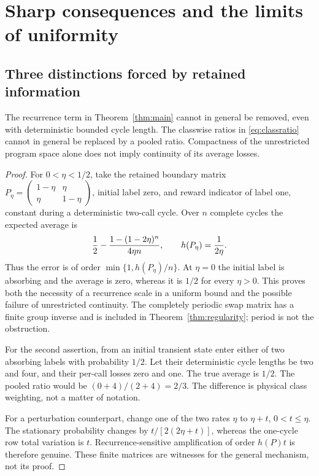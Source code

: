 \section{Sharp consequences and the limits of uniformity}\label{sec:sharp}
\subsection{Three distinctions forced by retained information}
\begin{proposition}\label{prop:boundarysharp}
The recurrence term in Theorem~\ref{thm:main} cannot in general be removed, even with deterministic bounded cycle length. The classwise ratios in \eqref{eq:classratio} cannot in general be replaced by a pooled ratio. Compactness of the unrestricted program space alone does not imply continuity of its average losses.
\end{proposition}
\begin{proof}
For $0<\eta<1/2$, take the retained boundary matrix
$P_\eta=\left(\begin{smallmatrix}1-\eta&\eta\\\eta&1-\eta\end{smallmatrix}\right)$,
initial label zero, and reward indicator of label one, constant during a deterministic two-call cycle. Over $n$ complete cycles the expected average is
\begin{equation}\label{eq:slow}
 {1\over2}-{1-(1-2\eta)^n\over4\eta n},
 \qquad h(P_\eta)={1\over2\eta}.
\end{equation}
Thus the error is of order $\min\{1,h(P_\eta)/n\}$. At $\eta=0$ the initial label is absorbing and the average is zero, whereas it is $1/2$ for every $\eta>0$. This proves both the necessity of a recurrence scale in a uniform bound and the possible failure of unrestricted continuity. The completely periodic swap matrix has a finite group inverse and is included in Theorem~\ref{thm:regularity}; period is not the obstruction.

For the second assertion, from an initial transient state enter either of two absorbing labels with probability $1/2$. Let their deterministic cycle lengths be two and four, and their per-call losses zero and one. The true average is $1/2$. The pooled ratio would be $(0+4)/(2+4)=2/3$. The difference is physical class weighting, not a matter of notation.

For a perturbation counterpart, change one of the two rates $\eta$ to $\eta+t$, $0<t\le\eta$. The stationary probability changes by $t/[2(2\eta+t)]$, whereas the one-cycle row total variation is $t$. Recurrence-sensitive amplification of order $h(P)t$ is therefore genuine. These finite matrices are witnesses for the general mechanism, not its proof.
\end{proof}

